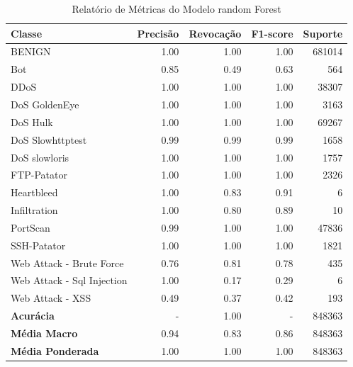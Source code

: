 \begin{table}[H]
    \centering
    \small
    \begin{tabular}{lrrrr}
        \hline
        Classe                     & Precisão & Revocação & F1-score & Suporte \\
        \hline
        BENIGN                     & 1.00     & 1.00      & 1.00     & 681014  \\
        Bot                        & 0.85     & 0.49      & 0.63     & 564     \\
        DDoS                       & 1.00     & 1.00      & 1.00     & 38307   \\
        DoS GoldenEye              & 1.00     & 1.00      & 1.00     & 3163    \\
        DoS Hulk                   & 1.00     & 1.00      & 1.00     & 69267   \\
        DoS Slowhttptest           & 0.99     & 0.99      & 0.99     & 1658    \\
        DoS slowloris              & 1.00     & 1.00      & 1.00     & 1757    \\
        FTP-Patator                & 1.00     & 1.00      & 1.00     & 2326    \\
        Heartbleed                 & 1.00     & 0.83      & 0.91     & 6       \\
        Infiltration               & 1.00     & 0.80      & 0.89     & 10      \\
        PortScan                   & 0.99     & 1.00      & 1.00     & 47836   \\
        SSH-Patator                & 1.00     & 1.00      & 1.00     & 1821    \\
        Web Attack - Brute Force   & 0.76     & 0.81      & 0.78     & 435     \\
        Web Attack - Sql Injection & 1.00     & 0.17      & 0.29     & 6       \\
        Web Attack - XSS           & 0.49     & 0.37      & 0.42     & 193     \\
        \hline
        \textbf{Acurácia}          & -        & 1.00      & -        & 848363  \\
        \textbf{Média Macro}       & 0.94     & 0.83      & 0.86     & 848363  \\
        \textbf{Média Ponderada}   & 1.00     & 1.00      & 1.00     & 848363  \\
        \hline
    \end{tabular}
    \caption{Relatório de Métricas do Modelo random Forest}
    \label{table:rf_completo_metricas}
\end{table}